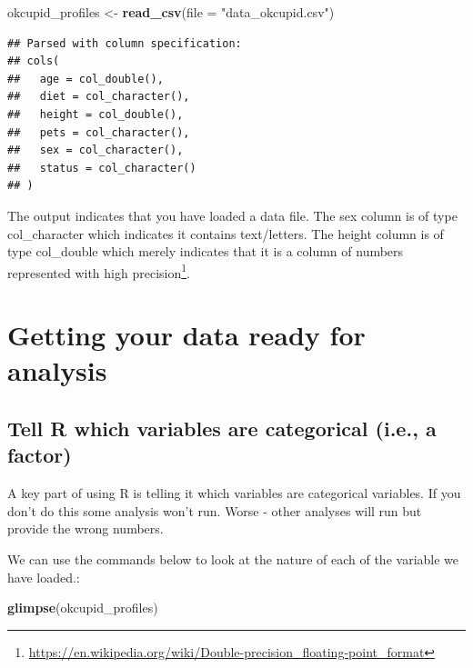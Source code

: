 \documentclass[
]{krantz}
\makeatletter
\newenvironment{Shaded}{\begin{snugshade}}{\end{snugshade}}
\newcommand{\DataTypeTok}[1]{\textcolor[rgb]{0.27,0.27,0.27}{#1}}
\newcommand{\KeywordTok}[1]{\textcolor[rgb]{0.27,0.27,0.27}{\textbf{#1}}}
\newcommand{\NormalTok}[1]{#1}
\newcommand{\StringTok}[1]{\textcolor[rgb]{0.5,0.5,0.5}{#1}}
\renewcommand{\href}[2]{#2\footnote{\url{#1}}}
\newenvironment{kframe}{%
\medskip{}
\setlength{\fboxsep}{.8em}
 \def\at@end@of@kframe{}%
 \ifinner\ifhmode%
  \def\at@end@of@kframe{\end{minipage}}%
  \begin{minipage}{\columnwidth}%
 \fi\fi%
 \def\FrameCommand##1{\hskip\@totalleftmargin \hskip-\fboxsep
 \colorbox{shadecolor}{##1}\hskip-\fboxsep
     \hskip-\linewidth \hskip-\@totalleftmargin \hskip\columnwidth}%
 \MakeFramed {\advance\hsize-\width
   \@totalleftmargin\z@ \linewidth\hsize
   \@setminipage}}%
 {\par\unskip\endMakeFramed%
 \at@end@of@kframe}
\renewenvironment{Shaded}{\begin{kframe}}{\end{kframe}}
\makeatother
\begin{document}
\begin{Shaded}
\begin{Highlighting}[]
\NormalTok{okcupid_profiles <-}\StringTok{ }\KeywordTok{read_csv}\NormalTok{(}\DataTypeTok{file =} \StringTok{"data_okcupid.csv"}\NormalTok{)}
\end{Highlighting}
\end{Shaded}

\begin{verbatim}
## Parsed with column specification:
## cols(
##   age = col_double(),
##   diet = col_character(),
##   height = col_double(),
##   pets = col_character(),
##   sex = col_character(),
##   status = col_character()
## )
\end{verbatim}

The output indicates that you have loaded a data file. The sex column is of type col\_character which indicates it contains text/letters. The height column is of type col\_double which merely indicates that it is a column of numbers represented with \href{https://en.wikipedia.org/wiki/Double-precision_floating-point_format}{high precision}.

\hypertarget{getting-your-data-ready-for-analysis}{%
\section{Getting your data ready for analysis}\label{getting-your-data-ready-for-analysis}}

\hypertarget{tell-r-which-variables-are-categorical-i.e.-a-factor}{%
\subsection{Tell R which variables are categorical (i.e., a factor)}\label{tell-r-which-variables-are-categorical-i.e.-a-factor}}

A key part of using R is telling it which variables are categorical variables. If you don't do this some analysis won't run. Worse - other analyses will run but provide the wrong numbers.

We can use the commands below to look at the nature of each of the variable we have loaded.:

\begin{Shaded}
\begin{Highlighting}[]
\KeywordTok{glimpse}\NormalTok{(okcupid_profiles)}
\end{Highlighting}
\end{Shaded}
\end{document}
